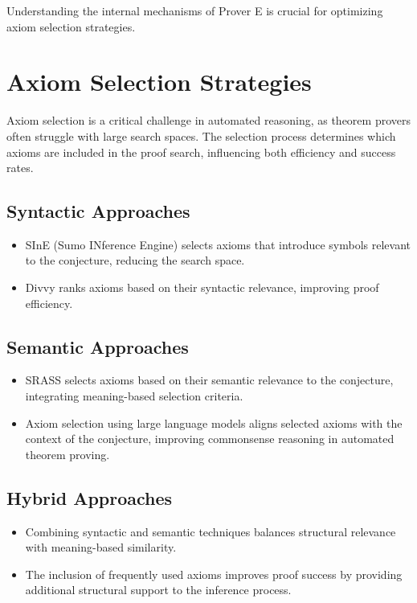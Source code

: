 \documentclass[english,version-2020-11]{uzl-thesis}
\begin{document}
Understanding the internal mechanisms of Prover E is crucial for optimizing axiom selection strategies.

\section{Axiom Selection Strategies}

Axiom selection is a critical challenge in automated reasoning, as theorem provers often struggle with large search spaces. The selection process determines which axioms are included in the proof search, influencing both efficiency and success rates.

\subsection{Syntactic Approaches}
\begin{itemize}
    \item SInE (Sumo INference Engine) \cite{Hoder2011} selects axioms that introduce symbols relevant to the conjecture, reducing the search space.
    \item Divvy \cite{Roederer2009} ranks axioms based on their syntactic relevance, improving proof efficiency.
\end{itemize}

\subsection{Semantic Approaches}
\begin{itemize}
    \item SRASS \cite{Sutcliffe2007} selects axioms based on their semantic relevance to the conjecture, integrating meaning-based selection criteria.
    \item Axiom selection using large language models \cite{Schon2024} aligns selected axioms with the context of the conjecture, improving commonsense reasoning in automated theorem proving.
\end{itemize}

\subsection{Hybrid Approaches}
\begin{itemize}
    \item Combining syntactic and semantic techniques balances structural relevance with meaning-based similarity.
    \item The inclusion of frequently used axioms improves proof success by providing additional structural support to the inference process.
\end{itemize}
\end{document}
